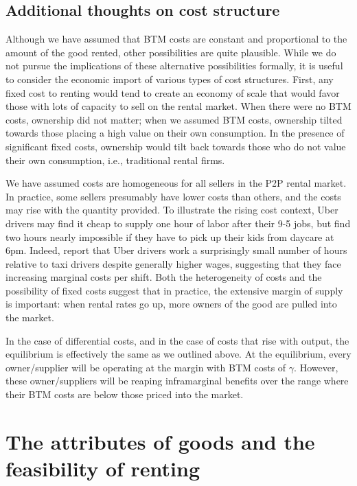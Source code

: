 \documentclass[11pt]{article}
\begin{document}
\subsection{Additional thoughts on cost structure}

Although we have assumed that BTM costs are constant and proportional to the amount of the good rented, other possibilities are quite plausible.
While we do not pursue the implications of these alternative possibilities formally, it is useful to consider the economic import of various types of cost structures.
First, any fixed cost to renting would tend to create an economy of scale that would favor those with lots of capacity to sell on the rental market.
When there were no BTM costs, ownership did not matter;
when we assumed BTM costs, ownership tilted towards those placing a high value on their own consumption.
In the presence of significant fixed costs, ownership would tilt back towards those who do not value their own consumption, i.e., traditional rental firms. 

We have assumed costs are homogeneous for all sellers in the P2P rental market.
In practice, some sellers presumably have lower costs than others, and the costs may rise with the quantity provided. 
To illustrate the rising cost context, Uber drivers may find it cheap to supply one hour of labor after their 9-5 jobs, but find two hours nearly impossible if they have to pick up their kids from daycare at 6pm.  
Indeed, \cite{hall2015analysis} report that Uber drivers work a surprisingly small number of hours relative to taxi drivers despite generally higher wages, suggesting that they face increasing marginal costs per shift. 
Both the heterogeneity of costs and the possibility of fixed costs suggest that in practice, the extensive margin of supply is important:
when rental rates go up, more owners of the good are pulled into the market. 

In the case of differential costs, and in the case of costs that rise with output, the equilibrium is effectively the same as we outlined above.
At the equilibrium, every owner/supplier will be operating at the margin with BTM costs of $\gamma$.
However, these owner/suppliers will be reaping inframarginal benefits over the range where their BTM costs are below those priced into the market. 

\section{The attributes of goods and the feasibility of renting} \label{sec:empirics} 
\end{document}
